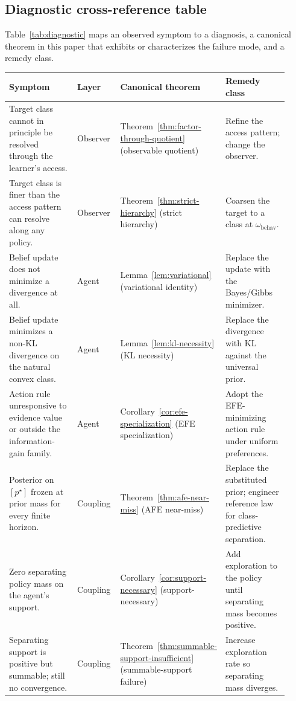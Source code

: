 \documentclass[11pt]{article}
\theoremstyle{definition}
\theoremstyle{remark}
\begin{document}
\subsection{Diagnostic cross-reference table}
\label{app:diagnostic-table}

Table~\ref{tab:diagnostic} maps an observed symptom to a diagnosis, a canonical theorem in this paper that exhibits or characterizes the failure mode, and a remedy class.

\begin{table}[h]
\centering\small
\renewcommand{\arraystretch}{1.25}
\begin{tabular}{p{0.30\linewidth}p{0.16\linewidth}p{0.20\linewidth}p{0.26\linewidth}}
\toprule
Symptom & Layer & Canonical theorem & Remedy class \\
\midrule
Target class cannot in principle be resolved through the learner's access. & Observer & Theorem~\ref{thm:factor-through-quotient} (observable quotient) & Refine the access pattern; change the observer. \\
Target class is finer than the access pattern can resolve along any policy. & Observer & Theorem~\ref{thm:strict-hierarchy} (strict hierarchy) & Coarsen the target to a class at $\omega_{\mathrm{behav}}$. \\
Belief update does not minimize a divergence at all. & Agent & Lemma~\ref{lem:variational} (variational identity) & Replace the update with the Bayes/Gibbs minimizer. \\
Belief update minimizes a non-KL divergence on the natural convex class. & Agent & Lemma~\ref{lem:kl-necessity} (KL necessity) & Replace the divergence with KL against the universal prior. \\
Action rule unresponsive to evidence value or outside the information-gain family. & Agent & Corollary~\ref{cor:efe-specialization} (EFE specialization) & Adopt the EFE-minimizing action rule under uniform preferences. \\
Posterior on $[p^\star]$ frozen at prior mass for every finite horizon. & Coupling & Theorem~\ref{thm:afe-near-miss} (AFE near-miss) & Replace the substituted prior; engineer reference law for class-predictive separation. \\
Zero separating policy mass on the agent's support. & Coupling & Corollary~\ref{cor:support-necessary} (support-necessary) & Add exploration to the policy until separating mass becomes positive. \\
Separating support is positive but summable; still no convergence. & Coupling & Theorem~\ref{thm:summable-support-insufficient} (summable-support failure) & Increase exploration rate so separating mass diverges. \\

\end{tabular}
\end{table}
\end{document}
